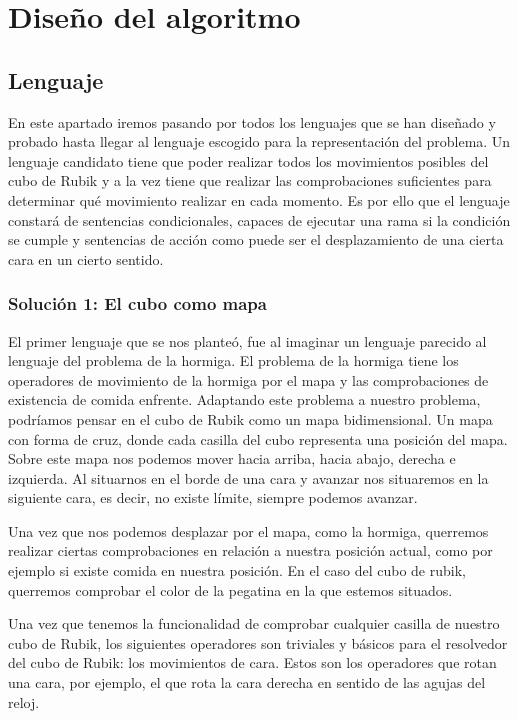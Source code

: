 \chapter{Diseño del algoritmo}\label{ch:diseno-algoritmo}


\section{Lenguaje}\label{sec:lenguaje}

En este apartado iremos pasando por todos los lenguajes que se han diseñado y
probado hasta llegar al lenguaje escogido para la representación del problema. Un
lenguaje candidato tiene que poder realizar todos los movimientos posibles del
cubo de Rubik y a la vez tiene que realizar las comprobaciones suficientes para
determinar qué movimiento realizar en cada momento. Es por ello que el lenguaje
constará de sentencias condicionales, capaces de ejecutar una rama si la
condición se cumple y sentencias de acción como puede ser el desplazamiento de
una cierta cara en un cierto sentido.

\subsection{Solución 1: El cubo como mapa}\label{subsec:solucion1}

El primer lenguaje que se nos planteó, fue al imaginar un lenguaje parecido al
lenguaje del problema de la hormiga. El problema de la hormiga tiene los
operadores de movimiento de la hormiga por el mapa y las comprobaciones de
existencia de comida enfrente. Adaptando este problema a nuestro problema,
podríamos pensar en el cubo de Rubik como un mapa bidimensional. Un mapa con
forma de cruz, donde cada casilla del cubo representa una posición del mapa.
Sobre este mapa nos podemos mover hacia arriba, hacia abajo, derecha e izquierda.
Al situarnos en el borde de una cara y avanzar nos situaremos en la siguiente
cara, es decir, no existe límite, siempre podemos avanzar.

Una vez que nos podemos desplazar por el mapa, como la hormiga, querremos
realizar ciertas comprobaciones en relación a nuestra posición actual, como por
ejemplo si existe comida en nuestra posición. En el caso del cubo de rubik,
querremos  comprobar el color de la pegatina en la que estemos situados.

Una vez que tenemos la funcionalidad de comprobar cualquier casilla de nuestro
cubo de Rubik, los siguientes operadores son triviales y básicos para el
resolvedor del cubo de Rubik: los movimientos de cara. Estos son los operadores
que rotan una cara, por ejemplo, el que rota la cara derecha en sentido de las
agujas del reloj.

